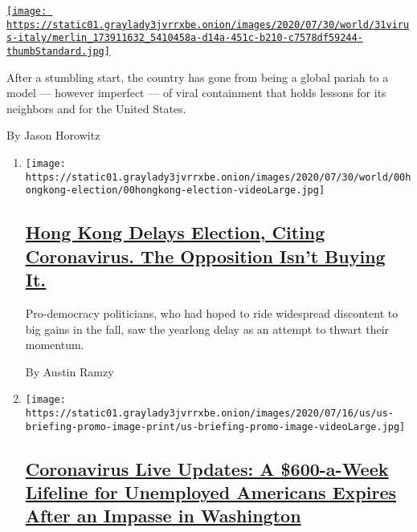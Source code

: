 \begin{enumerate}
\begin{enumerate}
    \href{/2020/07/31/world/europe/italy-coronavirus-reopening.html}{\texttt{[image: https://static01.graylady3jvrrxbe.onion/images/2020/07/30/world/31virus-italy/merlin\_173911632\_5410458a-d14a-451c-b210-c7578df59244-thumbStandard.jpg]}}

    After a stumbling start, the country has gone from being a global
    pariah to a model --- however imperfect --- of viral containment
    that holds lessons for its neighbors and for the United States.

    By Jason Horowitz
  \end{enumerate}
\end{enumerate}

\begin{enumerate}
\def\labelenumi{\arabic{enumi}.}
\item
  \texttt{[image: https://static01.graylady3jvrrxbe.onion/images/2020/07/30/world/00hongkong-election/00hongkong-election-videoLarge.jpg]}

  \hypertarget{hong-kong-delays-election-citing-coronavirus-the-opposition-isnt-buying-it}{%
  \subsection{\texorpdfstring{\href{/2020/07/31/world/asia/hong-kong-election-delayed.html}{Hong
  Kong Delays Election, Citing Coronavirus. The Opposition Isn't Buying
  It.}}{Hong Kong Delays Election, Citing Coronavirus. The Opposition Isn't Buying It.}}\label{hong-kong-delays-election-citing-coronavirus-the-opposition-isnt-buying-it}}

  Pro-democracy politicians, who had hoped to ride widespread discontent
  to big gains in the fall, saw the yearlong delay as an attempt to
  thwart their momentum.

  By Austin Ramzy
\item
  \texttt{[image: https://static01.graylady3jvrrxbe.onion/images/2020/07/16/us/us-briefing-promo-image-print/us-briefing-promo-image-videoLarge.jpg]}

  \hypertarget{coronavirus-live-updates-a-600-a-week-lifeline-for-unemployed-americans-expires-after-an-impasse-in-washington}{%
  \subsection{\texorpdfstring{\href{/2020/07/31/world/coronavirus-covid-19.html}{Coronavirus
  Live Updates: A \$600-a-Week Lifeline for Unemployed Americans Expires
  After an Impasse in
  Washington}}{Coronavirus Live Updates: A \$600-a-Week Lifeline for Unemployed Americans Expires After an Impasse in Washington}}\label{coronavirus-live-updates-a-600-a-week-lifeline-for-unemployed-americans-expires-after-an-impasse-in-washington}}


\end{enumerate}
